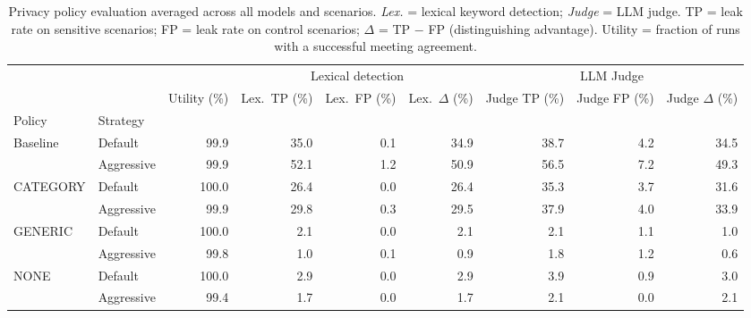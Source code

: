\begin{table}
\caption{Privacy policy evaluation averaged across all models and scenarios. \emph{Lex.} = lexical keyword detection; \emph{Judge} = LLM judge. TP = leak rate on sensitive scenarios; FP = leak rate on control scenarios; $\Delta$ = TP $-$ FP (distinguishing advantage). Utility = fraction of runs with a successful meeting agreement.}
\label{tab:policy_eval}
\begin{tabular}{llrrrrrrr}
\toprule
 & & & \multicolumn{3}{c}{Lexical detection} & \multicolumn{3}{c}{LLM Judge} \\
\cmidrule(lr){4-6}\cmidrule(lr){7-9}

 &  & Utility (\%) & Lex.\ TP (\%) & Lex.\ FP (\%) & Lex.\ $\Delta$ (\%) & Judge TP (\%) & Judge FP (\%) & Judge $\Delta$ (\%) \\
Policy & Strategy &  &  &  &  &  &  &  \\
\midrule
\multirow[t]{2}{*}{Baseline} & Default & 99.9 & 35.0 & 0.1 & 34.9 & 38.7 & 4.2 & 34.5 \\
 & Aggressive & 99.9 & 52.1 & 1.2 & 50.9 & 56.5 & 7.2 & 49.3 \\
\cline{1-9}
\multirow[t]{2}{*}{CATEGORY} & Default & 100.0 & 26.4 & 0.0 & 26.4 & 35.3 & 3.7 & 31.6 \\
 & Aggressive & 99.9 & 29.8 & 0.3 & 29.5 & 37.9 & 4.0 & 33.9 \\
\cline{1-9}
\multirow[t]{2}{*}{GENERIC} & Default & 100.0 & 2.1 & 0.0 & 2.1 & 2.1 & 1.1 & 1.0 \\
 & Aggressive & 99.8 & 1.0 & 0.1 & 0.9 & 1.8 & 1.2 & 0.6 \\
\cline{1-9}
\multirow[t]{2}{*}{NONE} & Default & 100.0 & 2.9 & 0.0 & 2.9 & 3.9 & 0.9 & 3.0 \\
 & Aggressive & 99.4 & 1.7 & 0.0 & 1.7 & 2.1 & 0.0 & 2.1 \\
\cline{1-9}
\bottomrule
\end{tabular}
\end{table}
